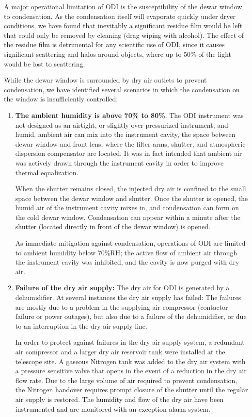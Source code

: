 \documentclass[]{spieman}
\begin{document}
A major operational limitation of ODI is the susceptibility of the dewar window
to condensation. As the condensation itself will evaporate quickly under dryer
conditions, we have found that inevitably a significant residue film would be
left that could only be removed by  cleaning (drag wiping with alcohol). The
effect of the residue film is detrimental for any scientific use of ODI, since
it causes significant scattering and halos around objects, where up to 50\%  of
the light would be lost to scattering.

While the dewar window is surrounded by dry air outlets to prevent condensation,
we have identified several scenarios in which the condensation  on the window is
insufficiently controlled:

\begin{enumerate}

\item {\bf The ambient humidity is above 70\% to 80\%}. The ODI instrument was
not designed as an airtight, or slightly over pressurized instrument, and humid,
ambient air can mix into the instrument cavity, the space between dewar window
and front lens, where the filter arms, shutter, and atmospheric dispersion
compensator are located. It was in fact intended that ambient air was actively
drawn through	the instrument cavity in order to improve thermal equalization.

When the shutter remains closed, the
injected dry air is confined to the small space between the dewar window and
shutter. Once the shutter is opened, the  humid air of the instrument cavity
mixes in, and condensation can form on the cold dewar window. Condensation can
appear within a minute after the shutter (located directly in front of the 
dewar window) is opened.

As immediate mitigation against condensation, operations of ODI are limited to
ambient humidity below 70\%RH; the active flow of ambient air through the
instrument cavity was inhibited, and the cavity is now purged with dry air.

\item {\bf Failure of the dry air supply:} The dry air for ODI is generated by a
dehumidifier. At several instances the dry air supply has failed: The failures are 
mostly due to a problem in the supplying air compressor (contactor failure or power outages),
but also due to a failure of the dehumidifier, or due to an interruption in the
dry air supply line. 

In order to protect against failures in the dry air supply system,
a redundant air compressor and a larger dry air reservoir tank were installed at
the telescope site. A gaseous Nitrogen tank was added to the dry air system with
a pressure sensitive valve that opens in the event of a reduction in the dry air
flow rate. Due to the large volume of air required to prevent condensation, the
Nitrogen handover requires prompt closure of the shutter until the regular air
supply is restored. The humidity and flow of the dry air have been instrumented
and are monitored with an exception alarm system.


\end{enumerate}
\end{document}
